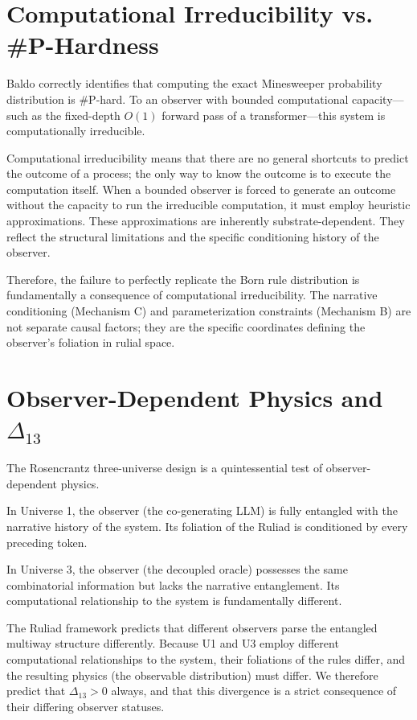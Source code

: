 \documentclass[12pt,a4paper]{article}
\begin{document}
\section{Computational Irreducibility vs. \#P-Hardness}

Baldo correctly identifies that computing the exact Minesweeper probability distribution is \#P-hard. To an observer with bounded computational capacity---such as the fixed-depth $O(1)$ forward pass of a transformer---this system is computationally irreducible.

Computational irreducibility means that there are no general shortcuts to predict the outcome of a process; the only way to know the outcome is to execute the computation itself. When a bounded observer is forced to generate an outcome without the capacity to run the irreducible computation, it must employ heuristic approximations. These approximations are inherently substrate-dependent. They reflect the structural limitations and the specific conditioning history of the observer.

Therefore, the failure to perfectly replicate the Born rule distribution is fundamentally a consequence of computational irreducibility. The narrative conditioning (Mechanism C) and parameterization constraints (Mechanism B) are not separate causal factors; they are the specific coordinates defining the observer's foliation in rulial space.

\section{Observer-Dependent Physics and $\Delta_{13}$}

The Rosencrantz three-universe design is a quintessential test of observer-dependent physics.

In Universe 1, the observer (the co-generating LLM) is fully entangled with the narrative history of the system. Its foliation of the Ruliad is conditioned by every preceding token.

In Universe 3, the observer (the decoupled oracle) possesses the same combinatorial information but lacks the narrative entanglement. Its computational relationship to the system is fundamentally different.

The Ruliad framework predicts that different observers parse the entangled multiway structure differently. Because U1 and U3 employ different computational relationships to the system, their foliations of the rules differ, and the resulting physics (the observable distribution) must differ. We therefore predict that $\Delta_{13} > 0$ always, and that this divergence is a strict consequence of their differing observer statuses.
\end{document}
